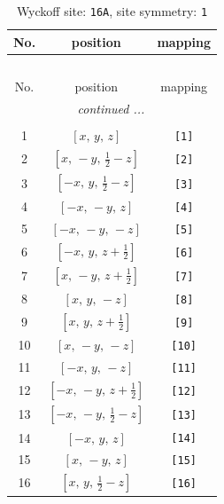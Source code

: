 \documentclass[fleqn,8pt]{jsarticle}
\begin{document}
\begin{longtable}{ccc}
\caption{Wyckoff site: {\tt 16A}, site symmetry: {\tt 1}}
 \\
 \hline \hline
No. & position & mapping \\ \hline \endfirsthead

\multicolumn{2}{l}{\tablename\ \thetable{}} \\
 \hline \hline
No. & position & mapping \\ \hline \endhead

 \hline \hline
\multicolumn{2}{r}{\footnotesize\it continued ...} \\ \endfoot

 \hline \hline
\multicolumn{2}{r}{} \\ \endlastfoot

1 & $\left[ x,\, y,\, z \right]$ & {\tt [1]} \\ \hline
2 & $\left[ x,\, - y,\, \frac{1}{2} - z \right]$ & {\tt [2]} \\ \hline
3 & $\left[ - x,\, y,\, \frac{1}{2} - z \right]$ & {\tt [3]} \\ \hline
4 & $\left[ - x,\, - y,\, z \right]$ & {\tt [4]} \\ \hline
5 & $\left[ - x,\, - y,\, - z \right]$ & {\tt [5]} \\ \hline
6 & $\left[ - x,\, y,\, z + \frac{1}{2} \right]$ & {\tt [6]} \\ \hline
7 & $\left[ x,\, - y,\, z + \frac{1}{2} \right]$ & {\tt [7]} \\ \hline
8 & $\left[ x,\, y,\, - z \right]$ & {\tt [8]} \\ \hline
9 & $\left[ x,\, y,\, z + \frac{1}{2} \right]$ & {\tt [9]} \\ \hline
10 & $\left[ x,\, - y,\, - z \right]$ & {\tt [10]} \\ \hline
11 & $\left[ - x,\, y,\, - z \right]$ & {\tt [11]} \\ \hline
12 & $\left[ - x,\, - y,\, z + \frac{1}{2} \right]$ & {\tt [12]} \\ \hline
13 & $\left[ - x,\, - y,\, \frac{1}{2} - z \right]$ & {\tt [13]} \\ \hline
14 & $\left[ - x,\, y,\, z \right]$ & {\tt [14]} \\ \hline
15 & $\left[ x,\, - y,\, z \right]$ & {\tt [15]} \\ \hline
16 & $\left[ x,\, y,\, \frac{1}{2} - z \right]$ & {\tt [16]} \\
\end{longtable}
\end{document}
